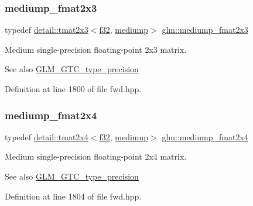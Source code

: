 \subsubsection{\texorpdfstring{mediump\+\_\+fmat2x3}{mediump\_fmat2x3}}
{\footnotesize\ttfamily typedef \hyperlink{structglm_1_1detail_1_1tmat2x3}{detail\+::tmat2x3}$<$\hyperlink{group__gtc__type__precision_ga0ec999b57f5330d9021256e96038df04}{f32}, \hyperlink{namespaceglm_a0f04f086094c747d227af4425893f545a6416f3ea0c9025fb21ed50c4d6620482}{mediump}$>$ \hyperlink{group__gtc__type__precision_gaae7081e19f495e7cdbf727e1550b95a8}{glm\+::mediump\+\_\+fmat2x3}}

Medium single-\/precision floating-\/point 2x3 matrix. \begin{DoxySeeAlso}{See also}
\hyperlink{group__gtc__type__precision}{G\+L\+M\+\_\+\+G\+T\+C\+\_\+type\+\_\+precision} 
\end{DoxySeeAlso}


Definition at line 1800 of file fwd.\+hpp.

\mbox{\label{group__gtc__type__precision_ga8f793d90a5a6bea23c13ad195fcb5de2}} 
\subsubsection{\texorpdfstring{mediump\+\_\+fmat2x4}{mediump\_fmat2x4}}
{\footnotesize\ttfamily typedef \hyperlink{structglm_1_1detail_1_1tmat2x4}{detail\+::tmat2x4}$<$\hyperlink{group__gtc__type__precision_ga0ec999b57f5330d9021256e96038df04}{f32}, \hyperlink{namespaceglm_a0f04f086094c747d227af4425893f545a6416f3ea0c9025fb21ed50c4d6620482}{mediump}$>$ \hyperlink{group__gtc__type__precision_ga8f793d90a5a6bea23c13ad195fcb5de2}{glm\+::mediump\+\_\+fmat2x4}}

Medium single-\/precision floating-\/point 2x4 matrix. \begin{DoxySeeAlso}{See also}
\hyperlink{group__gtc__type__precision}{G\+L\+M\+\_\+\+G\+T\+C\+\_\+type\+\_\+precision} 
\end{DoxySeeAlso}


Definition at line 1804 of file fwd.\+hpp.

\mbox{\label{group__gtc__type__precision_ga85f2267401434ea8c5463af040f0760c}} 
